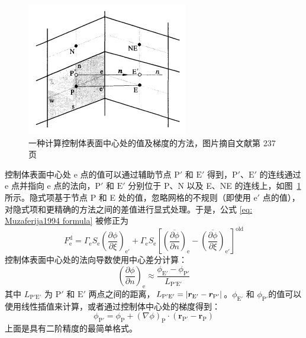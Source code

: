 \begin{figure}
	\centering
	\includegraphics[scale=.8]{figs/alternative-way}
	\caption{一种计算控制体表面中心处的值及梯度的方法，图片摘自文献第 237 页}
	\label{fig: alternative way}
\end{figure}

控制体表面中心处 e 点的值可以通过辅助节点 $\mathrm{P}'$ 和 $\mathrm{E}'$ 得到，$\mathrm{P}'$、$\mathrm{E}'$ 的连线通过 e 点并指向 e 点的法向，$\mathrm{P}'$ 和 $\mathrm{E}'$ 分别位于 P、N 以及 E、NE 的连线上，如图~\ref{fig: alternative way} 所示。隐式项基于节点 P 和 E 处的值，忽略网格的不规则（即使用 $\mathrm{e}'$ 点的值），对隐式项和更精确的方法之间的差值进行显式处理。于是，公式 \eqref{eq: Muzaferija1994 formula} 被修正为
\begin{equation}
	F_{\mathrm{e}}^{\mathrm{d}} = \varGamma_{\mathrm{e}}S_{\mathrm{e}}\left(\frac{\partial\phi}{\partial\xi}\right)_{\mathrm{e'}} +
	\varGamma_{\mathrm{e}}S_{\mathrm{e}}\left[ 
	\overline{\left(\frac{\partial\phi}{\partial n}\right)}_{\mathrm{e}} - 
	\overline{\left(\frac{\partial\phi}{\partial\xi}\right)}_{\mathrm{e'}} \right]^{\mathrm{old}}
\end{equation}
控制体表面中心处的法向导数使用中心差分计算：
\begin{equation}
	\left(\frac{\partial\phi}{\partial n}\right)_{\mathrm{e}} \approx
	\frac{\phi_{\mathrm{E'}}-\phi_{\mathrm{P'}}}{L_{\mathrm{P'E'}}}
\end{equation}
其中 $L_{\mathrm{P'E'}}$ 为 $\mathrm{P}'$ 和 $\mathrm{E}'$ 两点之间的距离，$L_{\mathrm{P'E'}} = \lvert\bm{r}_{\mathrm{E'}}-\bm{r}_{\mathrm{P'}}\vert$。$\phi_{\mathrm{E'}}$ 和 $\phi_{\mathrm{P'}}$的值可以使用线性插值来计算，或者通过控制体中心处的梯度得到：
\begin{equation}
	\phi_{\mathrm{P'}} = \phi_{\mathrm{P}} + (\nabla\phi)_{\mathrm{P}}\cdot(\bm{r}_{\mathrm{P'}}-\bm{r}_{\mathrm{P}})
\end{equation}
上面是具有二阶精度的最简单格式。

